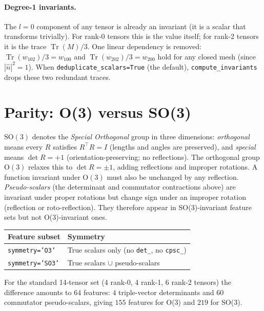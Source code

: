 \documentclass[11pt,a4paper]{article}
\begin{document}
\paragraph{Degree-1 invariants.}
The $l=0$ component of any tensor is already an invariant (it is a scalar that
transforms trivially).
For rank-0 tensors this is the value itself; for rank-2 tensors it is the trace
$\operatorname{Tr}(M)/3$.
One linear dependency is removed: $\operatorname{Tr}(w_{102})/3 = w_{100}$
and $\operatorname{Tr}(w_{202})/3 = w_{200}$ hold for any closed mesh
(since $|\hat{n}|^2 = 1$).
When \texttt{deduplicate\_scalars=True} (the default), \texttt{compute\_invariants}
drops these two redundant traces.

\section{Parity: O(3) versus SO(3)}
\label{sec:parity}

$\mathrm{SO}(3)$ denotes the \emph{Special Orthogonal} group in three dimensions:
\emph{orthogonal} means every $R$ satisfies $R^\top R = I$ (lengths and angles are preserved), and \emph{special} means $\det R = +1$ (orientation-preserving; no reflections).
The orthogonal group $\mathrm{O}(3)$ relaxes this to $\det R = \pm 1$, adding reflections and improper rotations.
A function invariant under $\mathrm{O}(3)$ must also be unchanged by any
reflection.
\emph{Pseudo-scalars} (the determinant and commutator contractions above) are
invariant under proper rotations but change sign under an improper rotation
(reflection or roto-reflection).
They therefore appear in SO(3)-invariant feature sets but not O(3)-invariant ones.

\begin{center}
\begin{tabular}{ll}
\toprule
Feature subset & Symmetry \\
\midrule
\texttt{symmetry='O3'} & True scalars only (no \texttt{det\_}, no \texttt{cpsc\_}) \\
\texttt{symmetry='SO3'} & True scalars $\cup$ pseudo-scalars \\
\bottomrule
\end{tabular}
\end{center}

For the standard 14-tensor set (4 rank-0, 4 rank-1, 6 rank-2 tensors) the
difference amounts to $64$ features: $4$ triple-vector determinants and
$60$ commutator pseudo-scalars, giving $155$ features for O(3) and $219$ for
SO(3).
\end{document}
